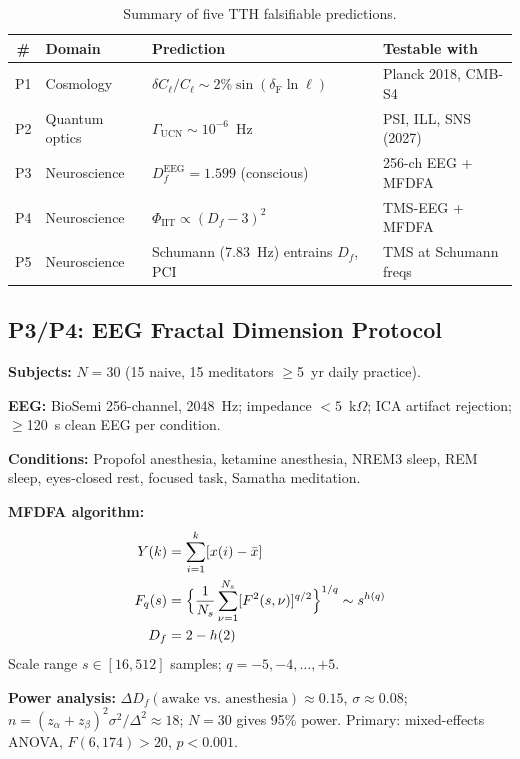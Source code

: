 \documentclass[12pt,a4paper]{article}
\newcommand{\Feig}{\delta_{\mathrm{F}}}
\numberwithin{equation}{section}
\begin{document}
\begin{table}[htbp]
\centering
\caption{Summary of five TTH falsifiable predictions.}
\label{tab:predictions}
\begin{tabular}{clll}
\toprule
\# & \textbf{Domain} & \textbf{Prediction} & \textbf{Testable with}\\
\midrule
P1 & Cosmology & $\delta C_\ell/C_\ell \sim 2\%\sin(\Feig\ln\ell)$ & Planck 2018, CMB-S4\\
P2 & Quantum optics & $\Gamma_{\mathrm{UCN}} \sim 10^{-6}$~Hz & PSI, ILL, SNS (2027)\\
P3 & Neuroscience & $D_f^{\mathrm{EEG}} = 1.599$ (conscious) & 256-ch EEG + MFDFA\\
P4 & Neuroscience & $\Phi_{\mathrm{IIT}} \propto (D_f-3)^2$ & TMS-EEG + MFDFA\\
P5 & Neuroscience & Schumann (7.83~Hz) entrains $D_f$, PCI & TMS at Schumann freqs\\
\bottomrule
\end{tabular}
\end{table}

\subsection{P3/P4: EEG Fractal Dimension Protocol}

\textbf{Subjects:} $N=30$ (15 naive, 15 meditators $\geq$5~yr daily practice).

\textbf{EEG:} BioSemi 256-channel, 2048~Hz; impedance $<5$~k$\Omega$;
ICA artifact rejection; $\geq$120~s clean EEG per condition.

\textbf{Conditions:} Propofol anesthesia, ketamine anesthesia, NREM3 sleep,
REM sleep, eyes-closed rest, focused task, Samatha meditation.

\textbf{MFDFA algorithm:}
\begin{align}
  Y(k) &= \sum_{i=1}^k [x(i) - \bar x] \label{eq:MFDFA1}\\
  F_q(s) &= \Bigl\{\frac{1}{N_s}\sum_{\nu=1}^{N_s}
  [F^2(s,\nu)]^{q/2}\Bigr\}^{1/q} \sim s^{h(q)} \label{eq:MFDFA2}\\
  D_f &= 2 - h(2) \label{eq:MFDFA3}
\end{align}
Scale range $s\in[16, 512]$ samples; $q = -5,-4,\ldots,+5$.

\textbf{Power analysis:}
$\Delta D_f(\text{awake vs.\ anesthesia}) \approx 0.15$, $\sigma \approx 0.08$;
$n = (z_\alpha+z_\beta)^2\sigma^2/\Delta^2 \approx 18$;
$N=30$ gives 95\% power. Primary: mixed-effects ANOVA, $F(6, 174)>20$, $p<0.001$.
\end{document}
